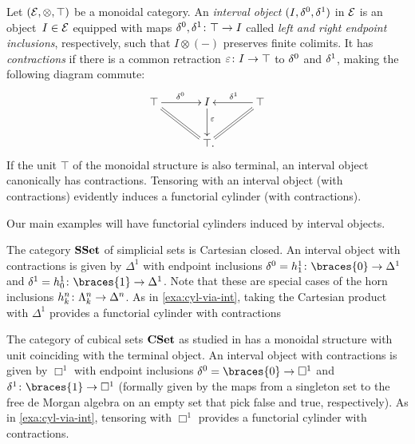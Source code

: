 \documentclass[reqno,10pt,a4paper,oneside,draft]{amsart}
\begin{document}
\begin{example} \label{exa:cyl-via-int}
Let $(\mathcal{E}, \otimes, \top)$ be a monoidal category.
An \emph{interval object} $(I, \delta^0, \delta^1)$ in $\mathcal{E}$ is an object~$I \in \mathcal{E}$ equipped with maps $\delta^0, \delta^1 \colon \top \to I$ called \emph{left and right endpoint inclusions}, respectively, such that $I \otimes (-)$ preserves finite colimits.
It has \emph{contractions} if there is a common retraction $\varepsilon \colon I \to \top$ to $\delta^0$ and $\delta^1$, making the following diagram commute:
\[
\xymatrix@C+1em{
  \top
  \ar[r]^{\lcyl}
  \ar@{=}[dr]
&
  \interval
  \ar[d]^(0.4){\ccyl}
&
  \top
  \ar[l]_{\rcyl}
  \ar@{=}[dl]
\\&
  \top
\rlap{.}}
\]
If the unit $\top$ of the monoidal structure is also terminal, an interval object canonically has contractions.
Tensoring with an interval object (with contractions) evidently induces a functorial cylinder (with contractions).
\end{example}

Our main examples will have functorial cylinders induced by interval objects.

\begin{example} \label{exa:cyl-in-sset}
The category $\mathbf{SSet}$ of simplicial sets is Cartesian closed.
An interval object with contractions is given by $\Delta^1$ with endpoint inclusions $\lcyl = h_1^1 \co \braces{0} \to \Delta^1$ and $\rcyl = h_0^1 \co \braces{1} \to \Delta^1$.
Note that these are special cases of the horn inclusions $h_k^n \colon \Lambda_k^n \to \Delta^n$.
As in \cref{exa:cyl-via-int}, taking the Cartesian product with $\Delta^1$ provides a functorial cylinder with contractions
\end{example}

\begin{example} \label{exa:cyl-in-cuset}
The category of cubical sets $\mathbf{CSet}$ as studied in \cite{coquand-variation} has a monoidal structure with unit coinciding with the terminal object.
An interval object with contractions is given by $\Box^1$ with endpoint inclusions $\lcyl = \braces{0} \to \Box^1$ and $\rcyl \co \braces{1} \to \Box^1$ (formally given by the maps from a singleton set to the free de Morgan algebra on an empty set that pick false and true, respectively).
As in \cref{exa:cyl-via-int}, tensoring with $\Box^1$ provides a functorial cylinder with contractions.
\end{example}
\end{document}
